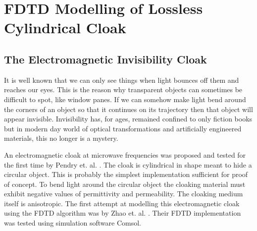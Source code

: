 \chapter{FDTD Modelling of Lossless Cylindrical Cloak}
\section{The Electromagnetic Invisibility Cloak}
It is well known that we can only see things when light bounces off them and reaches our eyes. This is the reason why transparent objects can sometimes be difficult to spot, like window panes. If we can somehow make light bend around the corners of an object so that it continues on its trajectory then that object will appear invisible. Invisibility has, for ages, remained confined to only fiction books but in modern day world of optical transformations and artificially engineered materials, this no longer is a mystery.

An electromagnetic cloak at microwave frequencies was proposed and tested for the first time by Pendry et. al. \cite{PendryShurig-MicrowaveCloak}. The cloak is cylindrical in shape meant to hide a circular object. This is probably the simplest implementation sufficient for proof of concept. To bend light around the circular object the cloaking material must exhibit negative values of permittivity and permeability. The cloaking medium itself is anisotropic. The first attempt at modelling this electromagnetic cloak using the FDTD algorithm was by Zhao et. al. \cite{Radial-Zhao}. Their FDTD implementation was tested using simulation software Comsol.
